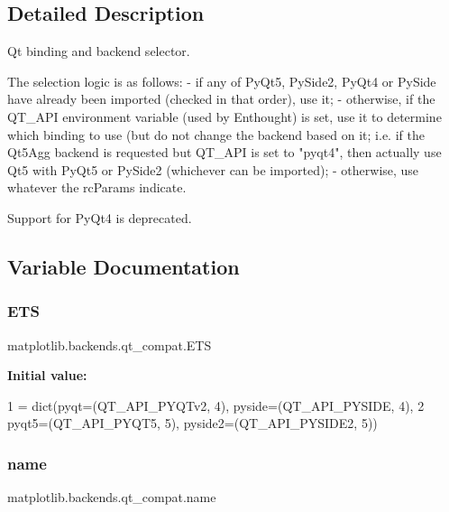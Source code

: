 \subsection{Detailed Description}
\begin{DoxyVerb}Qt binding and backend selector.

The selection logic is as follows:
- if any of PyQt5, PySide2, PyQt4 or PySide have already been imported
  (checked in that order), use it;
- otherwise, if the QT_API environment variable (used by Enthought) is set, use
  it to determine which binding to use (but do not change the backend based on
  it; i.e. if the Qt5Agg backend is requested but QT_API is set to "pyqt4",
  then actually use Qt5 with PyQt5 or PySide2 (whichever can be imported);
- otherwise, use whatever the rcParams indicate.

Support for PyQt4 is deprecated.
\end{DoxyVerb}
 

\subsection{Variable Documentation}
\mbox{\label{namespacematplotlib_1_1backends_1_1qt__compat_ade944931ef795d61fc0510787d37fcf4}} 
\subsubsection{\texorpdfstring{E\+TS}{ETS}}
{\footnotesize\ttfamily matplotlib.\+backends.\+qt\+\_\+compat.\+E\+TS}

{\bfseries Initial value\+:}
\begin{DoxyCode}
1 =  dict(pyqt=(QT\_API\_PYQTv2, 4), pyside=(QT\_API\_PYSIDE, 4),
2            pyqt5=(QT\_API\_PYQT5, 5), pyside2=(QT\_API\_PYSIDE2, 5))
\end{DoxyCode}
\mbox{\label{namespacematplotlib_1_1backends_1_1qt__compat_a4fe46769f3a1c4704d0b4adfd920ef0d}} 
\subsubsection{\texorpdfstring{name}{name}}
{\footnotesize\ttfamily matplotlib.\+backends.\+qt\+\_\+compat.\+name}

